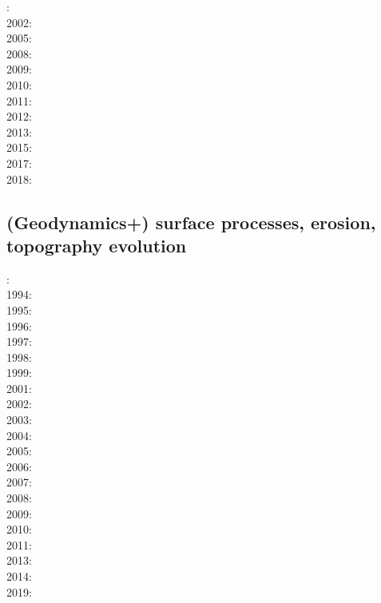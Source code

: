 : \cite{coks00}\\
2002: \cite{cacp02}\cite{coks02}\\
2005: \cite{cacs05}\cite{coks05}\\
2008: \cite{kans08}\cite{mofh08}\cite{dole08}\\
2009: \cite{coks09}\cite{cogo09}\\
2010: \cite{ngpc10}\cite{conp10}\cite{mofp10}\\
2011: \cite{geor11}\cite{ngpc11}\\
2012: \cite{kauf12}\cite{ngpe12}\cite[chapt. 31]{lomw12}\\
2013: \cite{vyrc13}\\
2015: \cite{lelk15} \\
2017: \cite{fewk17}\cite{iglo17}\cite{hepb17}\\
2018: \cite{puth18}

\mscthesis {}

\subsection*{(Geodynamics+) surface processes, erosion, topography evolution}

: \cite{befh92}\\
1994: \cite{howa94}\cite{koon94}\cite{kobe94}\\
1995: \cite{chmm95}\cite{koon95}\\
1996: \cite{avbu96}\\
1997: \cite{brsa97}\cite{gaft97}\\
1998: \cite{deea98}\cite{vabr98}\\
1999: \cite{will99a}\cite{bupi99}\cite{babr99}\\
2001: \cite{zemk01}\cite{tulg01}\cite{brsh01}\cite{bupo01}\cite{coul01}\cite{crda01}\\
2002: \cite{wibr02}\cite{mobr02}\cite{garc02}\\
2003: \cite{brau03}\\
2004: \cite{fijj04}\cite{gocl04}\\
2005: \cite{lave05}\cite{will05}\\
2006: \cite{rosw06}\cite{brau06gsl}\\
2007: \cite{buto07}\\
2008: \cite{alle08}\cite{rowf08}\\
2009: \cite{whip09}\cite{kuhe09}\cite{makh09}\\
2010: \cite{will10}\cite{tuha10}\cite{brau10b}\cite{brau10}\cite{brya10}\cite{cmwt10}\\
2011: \cite{robr11}\cite{grhd11}\\
2013: \cite{vehc13}\cite{brwi13}\cite{fihv13a}\cite{fihv13b} \\
2014: \cite{crbr14}\cite{cokm14}\cite{erhv14}\cite{erhv15} \\
2019: \cite{anpa19}

